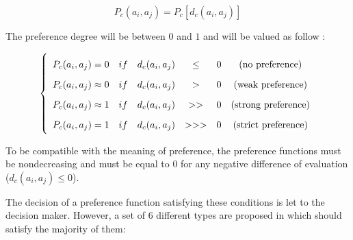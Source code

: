 \begin{equation}
    P_c(a_i,a_j)  = P_c[d_c(a_i,a_j)]
    \label{eq:generalised_criterion}
\end{equation}

The preference degree will be between $0$ and $1$ and will be valued as follow \cite{Bertrand2002}:


\begin{equation}
    \left\{
    \renewcommand{\arraystretch}{1.75}
    \begin{array}{l c c c c c c}
        P_c(a_i, a_j) = 0       & if & d_c(a_i,a_j) & \le & 0 & \text{(no preference)} \\
        P_c(a_i, a_j) \approx 0 & if & d_c(a_i,a_j) & >   & 0 & \text{(weak preference)} \\
        P_c(a_i, a_j) \approx 1 & if & d_c(a_i,a_j) & > > & 0 & \text{(strong preference)} \\
        P_c(a_i, a_j) = 1       & if & d_c(a_i,a_j) & >>> & 0 & \text{(strict preference)} \\
    \end{array} \right .
    \label{eq:preference_function_values}
\end{equation}

To be compatible with the meaning of preference, the preference functions must be nondecreasing and must be equal to $0$ for any negative difference of evaluation ($d_c(a_i,a_j) \le 0$).

The decision of a preference function satisfying these conditions is let to the decision maker. However, a set of $6$ different types are proposed in \cite{Bertrand2002} which should satisfy the majority of them:

